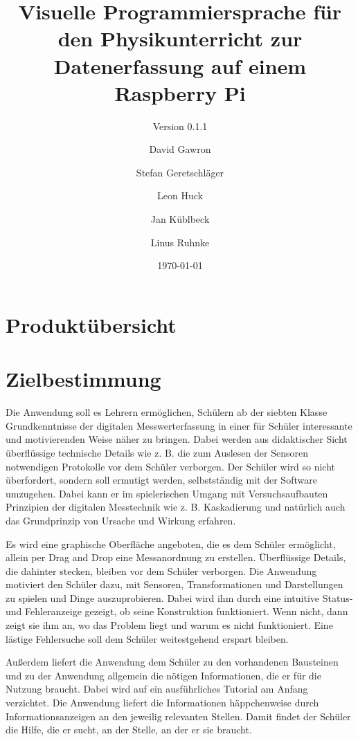 \documentclass[parskip=full]{scrartcl}
\title{Visuelle Programmiersprache für den Physikunterricht zur Datenerfassung auf einem Raspberry Pi}
\subtitle{Version 0.1.1}
\author{David Gawron \and Stefan Geretschläger \and Leon Huck \and Jan Küblbeck \and Linus Ruhnke}
\date{\today}
\begin{document}
\maketitle

\newpage

\tableofcontents 					%

\section{Produktübersicht}



\section{Zielbestimmung}

Die Anwendung soll es Lehrern ermöglichen, Schülern ab der siebten Klasse Grundkenntnisse der digitalen Messwerterfassung in einer für Schüler interessante und motivierenden Weise näher zu bringen. 
Dabei werden aus didaktischer Sicht überflüssige technische Details wie z. B. die zum Auslesen der Sensoren notwendigen Protokolle vor dem Schüler verborgen.
Der Schüler wird so nicht überfordert, sondern soll ermutigt werden, selbstständig mit der Software umzugehen. 
Dabei kann er im spielerischen Umgang mit Versuchsaufbauten Prinzipien der digitalen Messtechnik wie z. B. Kaskadierung und natürlich auch das Grundprinzip von Ursache und Wirkung erfahren.

Es wird eine graphische Oberfläche angeboten, die es dem Schüler ermöglicht, allein per Drag and Drop eine Messanordnung zu erstellen. 
Überflüssige Details, die dahinter stecken, bleiben vor dem Schüler verborgen.
Die Anwendung motiviert den Schüler dazu, mit Sensoren, Transformationen und Darstellungen zu spielen und Dinge auszuprobieren. 
Dabei wird ihm durch eine intuitive Status- und Fehleranzeige gezeigt, ob seine Konstruktion funktioniert. 
Wenn nicht, dann zeigt sie ihm an, wo das Problem liegt und warum es nicht funktioniert. 
Eine lästige Fehlersuche soll dem Schüler weitestgehend erspart bleiben. 

Außerdem liefert die Anwendung dem Schüler zu den vorhandenen Bausteinen und zu der Anwendung allgemein die nötigen Informationen, die er für die Nutzung braucht. Dabei wird auf ein ausführliches Tutorial am Anfang verzichtet. Die Anwendung liefert die Informationen häppchenweise durch Informationsanzeigen an den jeweilig relevanten Stellen. Damit findet der Schüler die Hilfe, die er sucht, an der Stelle, an der er sie braucht.
\end{document}
